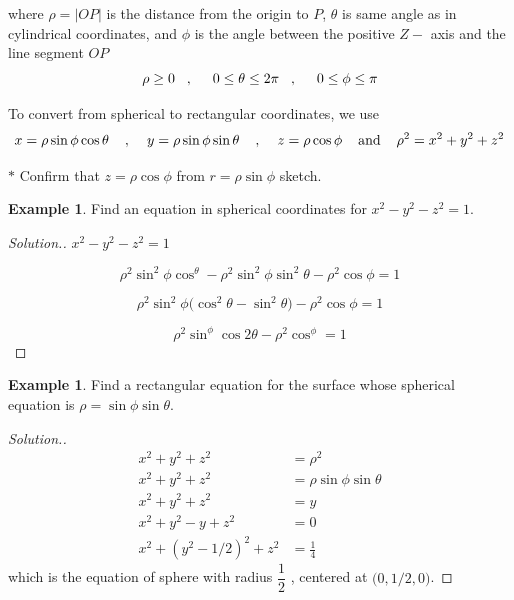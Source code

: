 \documentclass[11pt,a4paper]{article}
\theoremstyle{definition}
\newtheorem{exa}[thm]{Example}
\newenvironment{solution}
  {\renewcommand{\qedsymbol}{}\begin{proof}[\textit{Solution}.]}
  {\end{proof}}
\begin{document}
where $\rho = \big|OP\big|$ is the distance from the origin to $P$, $\theta$ is same angle as in cylindrical coordinates, and $\phi$ is the angle between the positive $Z-$ axis and the line segment $OP$
$$\rho\geq 0\hspace{0.3cm}, \hspace{0.5cm} 0\leq \theta \leq 2\pi\hspace{0.3cm} , \hspace{0.5cm} 0 \leq \phi \leq \pi$$

To convert from spherical to rectangular coordinates, we use $$x = \rho \sin \phi \cos \theta\hspace{0.4cm} , \hspace{0.4cm} y =\rho \sin \phi \sin \theta\hspace{0.4cm} , \hspace{0.4cm} z = \rho \cos \phi\hspace{0.4cm} \text{and}\hspace{0.4cm} \rho^2 = x^2 + y^2 + z^2$$

$*$ Confirm that $z = \rho \cos \phi$ from $r=\rho \sin \phi$ sketch.


\begin{exa}


Find an equation in spherical coordinates for $x^2 -y^2 -z^2 = 1$.
\end{exa}


\begin{solution}


$x^2 -y^2 -z^2 = 1$

$$\rho^2\sin^2\phi \cos^ \theta - \rho^2 \sin^2\phi \sin^2\theta - \rho^2\cos\phi = 1$$

$$\rho^2\sin^2\phi \big(\cos^2\theta - \sin^2 \theta\big) -\rho^2\cos\phi = 1$$

$$\rho^2\sin^\phi \cos2\theta - \rho^2\cos^\phi =1$$
\end{solution}


\begin{exa}


Find a rectangular equation for the surface whose spherical equation is $\rho = \sin \phi \sin \theta$.
\end{exa}


\begin{solution}
\begin{align*}
x^2 + y^2 + z^2 & = \rho^2\\
x^2 + y^2 +z^2  &  = \rho \sin \phi \sin \theta\\
x^2 + y^2 + z^2 & = y\\
x^2 + y^2 -y + z^2 & = 0\\
x^2 + (y^2 -1/2)^2 + z^2 & = \frac{1}{4}
\end{align*}
which is the equation of sphere with radius $\dfrac{1}{2}$ , centered at $\big(0, 1/2,0\big)$.
\end{solution}
\end{document}
